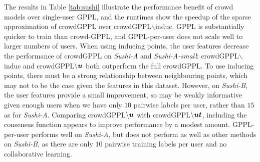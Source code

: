 The results in Table \ref{tab:sushi} 
illustrate the performance benefit of crowd models over single-user GPPL, and
the runtimes 
show the speedup of the sparse approximation of crowdGPPL over crowdGPPL$\backslash$induc.
GPPL is substantially quicker to train than crowd-GPPL, and GPPL-per-user does not scale well to larger numbers
of users.
 When using inducing points, the user features decrease the performance of crowdGPPL on \emph{Sushi-A} and \emph{Sushi-A-small}: crowdGPPL$\backslash$induc
 and crowdGPPL$\backslash\boldsymbol u$ both outperform the full crowdGPPL. 
 To use inducing points,
 there must be a strong relationship between neighbouring points, which
 may not to be the case given the features in this dataset.
 However, on \emph{Sushi-B}, the user features provide a small improvement, so may be weakly informative
 given enough users when we have only $10$ pairwise labels per user, rather than $15$ as for \emph{Sushi-A}.
 Comparing crowdGPPL$\backslash\boldsymbol u$ with crowdGPPL$\backslash\boldsymbol u\boldsymbol t$, including the consensus function appears to improve performance by a modest amount.
 GPPL-per-user performs well on \emph{Sushi-A}, but does not perform as well as other methods on \emph{Sushi-B}, as
there are only $10$ pairwise training labels per user and no collaborative learning.


